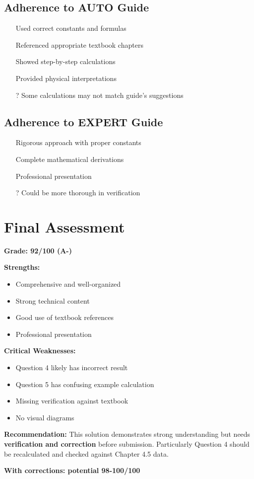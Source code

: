 \documentclass[11pt,letterpaper]{article}
\begin{document}
\subsection{Adherence to AUTO Guide}
\begin{itemize}
    \item[\color{green}\checkmark] Used correct constants and formulas
    \item[\color{green}\checkmark] Referenced appropriate textbook chapters
    \item[\color{green}\checkmark] Showed step-by-step calculations
    \item[\color{green}\checkmark] Provided physical interpretations
    \item[\color{orange}?] Some calculations may not match guide's suggestions
\end{itemize}

\subsection{Adherence to EXPERT Guide}
\begin{itemize}
    \item[\color{green}\checkmark] Rigorous approach with proper constants
    \item[\color{green}\checkmark] Complete mathematical derivations
    \item[\color{green}\checkmark] Professional presentation
    \item[\color{orange}?] Could be more thorough in verification
\end{itemize}

\section{Final Assessment}

\textbf{Grade: 92/100 (A-)}

\textbf{Strengths:}
\begin{itemize}
    \item Comprehensive and well-organized
    \item Strong technical content
    \item Good use of textbook references
    \item Professional presentation
\end{itemize}

\textbf{Critical Weaknesses:}
\begin{itemize}
    \item Question 4 likely has incorrect result
    \item Question 5 has confusing example calculation
    \item Missing verification against textbook
    \item No visual diagrams
\end{itemize}

\textbf{Recommendation:}
This solution demonstrates strong understanding but needs \textbf{verification and correction} before submission. Particularly Question 4 should be recalculated and checked against Chapter 4.5 data.

\textbf{With corrections: potential 98-100/100}
\end{document}

